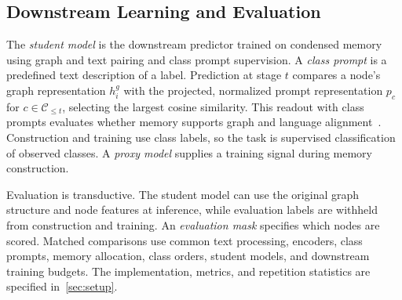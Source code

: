 \subsection{Downstream Learning and Evaluation}
\label{sec:evaluation_protocol}

The \emph{student model} is the downstream predictor trained on condensed
memory using graph and text pairing and class prompt supervision. A \emph{class prompt} is a
predefined text description of a label. Prediction at stage $t$ compares a
node's graph representation
$h_i^g$ with the projected, normalized prompt representation $p_c$ for
$c\in\mathcal C_{\leq t}$, selecting the largest cosine similarity. This
readout with class prompts evaluates whether memory supports graph and language
alignment~\cite{graphclip}. Construction and training use class labels,
so the task is supervised classification of observed classes. A
\emph{proxy model} supplies a training signal during memory construction.

Evaluation is transductive. The student model can use the original graph
structure and node features at inference, while evaluation labels are
withheld from construction and training. An \emph{evaluation mask}
specifies which nodes are scored. Matched comparisons use common text
processing, encoders, class prompts, memory allocation, class orders,
student models, and downstream training budgets. The implementation,
metrics, and repetition statistics are specified in~\autoref{sec:setup}.
